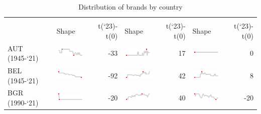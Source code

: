\begin{table}[H]
\centering
\caption{Distribution of brands by country \label{tab:country_table}}
\centering
\begin{tabular}[t]{l>{}lr>{}lr>{}lr}
\toprule
{} &  &  &  \\
\cmidrule(l{3pt}r{3pt}){2-3} \cmidrule(l{3pt}r{3pt}){4-5} \cmidrule(l{3pt}r{3pt}){6-7}
  & Shape & t(`23)-t(0) & Shape & t(`23)-t(0) & Shape & t(`23)-t(0)\\
\midrule
AUT (1945-`21) & \includegraphics[width=0.67in, height=0.17in]{./figures/spec_plot/plot_14f3c6af15084.pdf} & -33 & \includegraphics[width=0.67in, height=0.17in]{./figures/spec_plot/plot_14f3c2f4164a6.pdf} & 17 & \includegraphics[width=0.67in, height=0.17in]{./figures/spec_plot/plot_14f3c66bd80a1.pdf} & 0\\
BEL (1945-`21) & \includegraphics[width=0.67in, height=0.17in]{./figures/spec_plot/plot_14f3c75d3db05.pdf} & -92 & \includegraphics[width=0.67in, height=0.17in]{./figures/spec_plot/plot_14f3c56589ff1.pdf} & 42 & \includegraphics[width=0.67in, height=0.17in]{./figures/spec_plot/plot_14f3c4ba435c7.pdf} & 8\\
BGR (1990-`21) & \includegraphics[width=0.67in, height=0.17in]{./figures/spec_plot/plot_14f3c61be0189.pdf} & -20 & \includegraphics[width=0.67in, height=0.17in]{./figures/spec_plot/plot_14f3c2c7cc3cd.pdf} & 40 & \includegraphics[width=0.67in, height=0.17in]{./figures/spec_plot/plot_14f3c5812d66e.pdf} & -20\\

\end{tabular}
\end{table}
